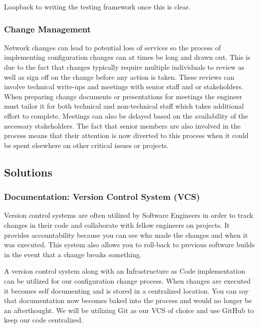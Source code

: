 \documentclass[12pt, letterpaper]{article}
\begin{document}
\smallskip

Loopback to writing the testing framework once this is clear.

	
	\subsubsection{Change Management}
Network changes can lead to potential loss of services so the process of implementing configuration changes can at times be long and drawn out. This is due to the fact that changes typically require multiple individuals to review as well as sign off on the change before any action is taken. These reviews can involve technical write-ups and meetings with senior staff and or stakeholders. When preparing change documents or presentations for meetings the engineer must tailor it for both technical and non-technical staff which takes additional effort to complete. Meetings can also be delayed based on the availability of the necessary stakeholders. The fact that senior members are also involved in the process means that their attention is now diverted to this process when it could be spent elsewhere on other critical issues or projects.


	\subsection{Solutions}
	
	\subsubsection{Documentation: Version Control System (VCS)}
Version control systems are often utilized by Software Engineers in order to track changes in their code and collaborate with fellow engineers on projects.
It provides accountability because you can see who made the changes and when it was executed.
This system also allows you to roll-back to previous software builds in the event that a change breaks something.

\smallskip

A version control system along with an Infrastructure as Code implementation can be utilized for our configuration change process.
When changes are executed it becomes self documenting and is stored in a centralized location. You can say that documentation now becomes baked into the process and would no longer be an afterthought. We will be utilizing Git as our VCS of choice and use GitHub to keep our code centralized.
\end{document}
